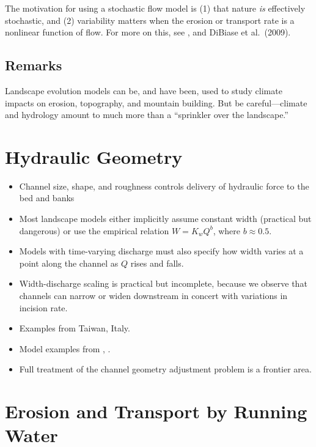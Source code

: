 \documentclass[12pt]{amsart}
\begin{document}
The motivation for using a stochastic flow model is (1) that nature {\em is} effectively stochastic, and (2) variability matters when the erosion or transport rate is a nonlinear function of flow. For more on this, see \citet{tucker2000stochastic,snyder2003importance,tucker2004drainage}, and DiBiase et al.\ (2009).

\subsection{Remarks}

Landscape evolution models can be, and have been, used to study climate impacts on erosion, topography, and mountain building. But be careful---climate and hydrology amount to much more than a ``sprinkler over the landscape.''

\section{Hydraulic Geometry}

\begin{itemize}
\item Channel size, shape, and roughness controls delivery of hydraulic force to the bed and banks
\item Most landscape models either implicitly assume constant width (practical but dangerous) or use the empirical relation $W = K_w Q^b$, where $b\approx 0.5$.
\item Models with time-varying discharge must also specify how width varies at a point along the channel as $Q$ rises and falls.
\item Width-discharge scaling is practical but incomplete, because we observe that channels can narrow or widen downstream in concert with variations in incision rate.
\item Examples from Taiwan, Italy.
\item Model examples from \citet{wobus2006self}, \citet{attal2008modeling}.
\item Full treatment of the channel geometry adjustment problem is a frontier area.
\end{itemize}

\section{Erosion and Transport by Running Water}
\end{document}

